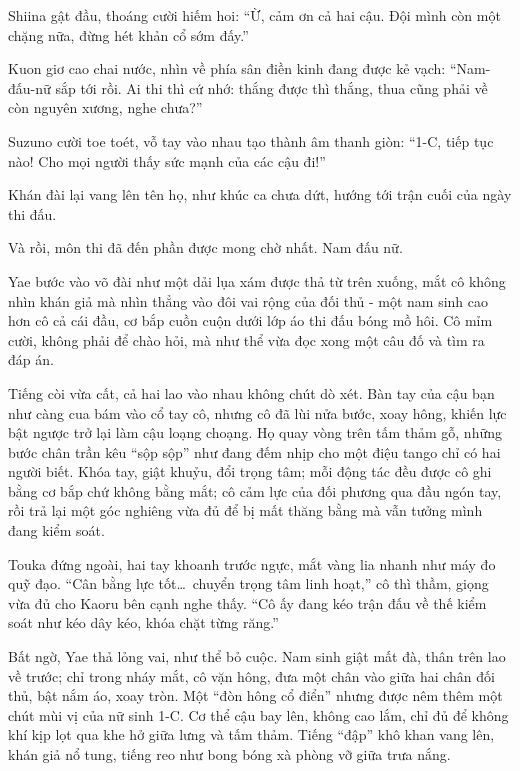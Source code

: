\documentclass[../main.tex]{subfiles}
\begin{document}
Shiina gật đầu, thoáng cười hiếm hoi: ``Ừ, cảm ơn cả hai cậu.  Đội mình còn một chặng nữa, đừng hét khản cổ sớm đấy.''

Kuon giơ cao chai nước, nhìn về phía sân điền kinh đang được kẻ vạch: ``Nam-đấu-nữ sắp tới rồi.  Ai thi thì cứ nhớ: thắng được thì thắng, thua cũng phải về còn nguyên xương, nghe chưa?''

Suzuno cười toe toét, vỗ tay vào nhau tạo thành âm thanh giòn: ``1-C, tiếp tục nào! Cho mọi người thấy sức mạnh của các cậu đi!''

Khán đài lại vang lên tên họ, như khúc ca chưa dứt, hướng tới trận cuối của ngày thi đấu.

\ct

Và rồi, môn thi đã đến phần được mong chờ nhất. Nam đấu nữ.

Yae bước vào võ đài như một dải lụa xám được thả từ trên xuống, mắt cô không nhìn khán giả mà nhìn thẳng vào đôi vai rộng của đối thủ - một nam sinh cao hơn cô cả cái đầu, cơ bắp cuồn cuộn dưới lớp áo thi đấu bóng mồ hôi. Cô mỉm cười, không phải để chào hỏi, mà như thể vừa đọc xong một câu đố và tìm ra đáp án.

Tiếng còi vừa cất, cả hai lao vào nhau không chút dò xét. Bàn tay của cậu bạn như càng cua bám vào cổ tay cô, nhưng cô đã lùi nửa bước, xoay hông, khiến lực bật ngược trở lại làm cậu loạng choạng. Họ quay vòng trên tấm thảm gỗ, những bước chân trần kêu ``sộp sộp'' như đang đếm nhịp cho một điệu tango chỉ có hai người biết. Khóa tay, giật khuỷu, đổi trọng tâm; mỗi động tác đều được cô ghi bằng cơ bắp chứ không bằng mắt; cô cảm lực của đối phương qua đầu ngón tay, rồi trả lại một góc nghiêng vừa đủ để bị mất thăng bằng mà vẫn tưởng mình đang kiểm soát.

Touka đứng ngoài, hai tay khoanh trước ngực, mắt vàng lia nhanh như máy đo quỹ đạo. ``Cân bằng lực tốt\dots\ chuyển trọng tâm linh hoạt,'' cô thì thầm, giọng vừa đủ cho Kaoru bên cạnh nghe thấy. ``Cô ấy đang kéo trận đấu về thế kiểm soát như kéo dây kéo, khóa chặt từng răng.''

Bất ngờ, Yae thả lỏng vai, như thể bỏ cuộc. Nam sinh giật mất đà, thân trên lao về trước; chỉ trong nháy mắt, cô vặn hông, đưa một chân vào giữa hai chân đối thủ, bật nắm áo, xoay tròn. Một ``đòn hông cổ điển'' nhưng được nêm thêm một chút mùi vị của nữ sinh 1-C. Cơ thể cậu bay lên, không cao lắm, chỉ đủ để không khí kịp lọt qua khe hở giữa lưng và tấm thảm. Tiếng ``đập'' khô khan vang lên, khán giả nổ tung, tiếng reo như bong bóng xà phòng vỡ giữa trưa nắng.
\end{document}
